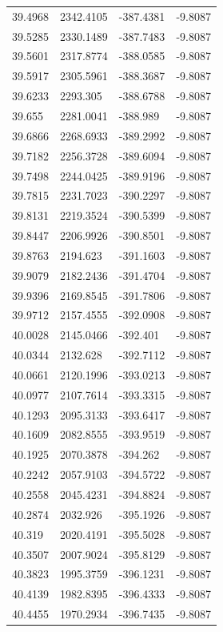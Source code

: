 \begin{table}[H]
\begin{tabular}{llll}
39.4968 & 2342.4105 & -387.4381 & -9.8087 \\
39.5285 & 2330.1489 & -387.7483 & -9.8087 \\
39.5601 & 2317.8774 & -388.0585 & -9.8087 \\
39.5917 & 2305.5961 & -388.3687 & -9.8087 \\
39.6233 & 2293.305 & -388.6788 & -9.8087 \\
39.655 & 2281.0041 & -388.989 & -9.8087 \\
39.6866 & 2268.6933 & -389.2992 & -9.8087 \\
39.7182 & 2256.3728 & -389.6094 & -9.8087 \\
39.7498 & 2244.0425 & -389.9196 & -9.8087 \\
39.7815 & 2231.7023 & -390.2297 & -9.8087 \\
39.8131 & 2219.3524 & -390.5399 & -9.8087 \\
39.8447 & 2206.9926 & -390.8501 & -9.8087 \\
39.8763 & 2194.623 & -391.1603 & -9.8087 \\
39.9079 & 2182.2436 & -391.4704 & -9.8087 \\
39.9396 & 2169.8545 & -391.7806 & -9.8087 \\
39.9712 & 2157.4555 & -392.0908 & -9.8087 \\
40.0028 & 2145.0466 & -392.401 & -9.8087 \\
40.0344 & 2132.628 & -392.7112 & -9.8087 \\
40.0661 & 2120.1996 & -393.0213 & -9.8087 \\
40.0977 & 2107.7614 & -393.3315 & -9.8087 \\
40.1293 & 2095.3133 & -393.6417 & -9.8087 \\
40.1609 & 2082.8555 & -393.9519 & -9.8087 \\
40.1925 & 2070.3878 & -394.262 & -9.8087 \\
40.2242 & 2057.9103 & -394.5722 & -9.8087 \\
40.2558 & 2045.4231 & -394.8824 & -9.8087 \\
40.2874 & 2032.926 & -395.1926 & -9.8087 \\
40.319 & 2020.4191 & -395.5028 & -9.8087 \\
40.3507 & 2007.9024 & -395.8129 & -9.8087 \\
40.3823 & 1995.3759 & -396.1231 & -9.8087 \\
40.4139 & 1982.8395 & -396.4333 & -9.8087 \\
40.4455 & 1970.2934 & -396.7435 & -9.8087 \\

\end{tabular}
\end{table}
